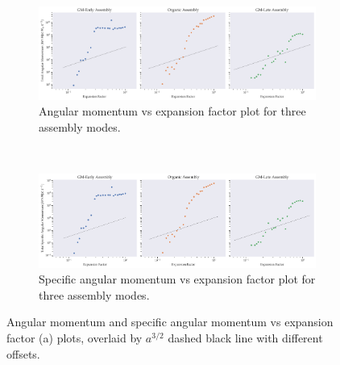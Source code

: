 \documentclass{article}
\begin{document}
	\begin{figure}
		\centering
		\begin{subfigure} {\columnwidth}
				\centering 
				\includegraphics[width=\columnwidth]{../../plots/angular_momentum/expansion_factor-net_angular_momentum.png}
				\caption{Angular momentum vs expansion factor plot for three assembly modes.}
		\end{subfigure} \\
			\vspace{1cm}
		\begin{subfigure} {\columnwidth}
				\centering 
				\includegraphics[width=\columnwidth]{../../plots/angular_momentum/expansion_factor-net_specific_angular_momentum.png}
				\caption{Specific angular momentum vs expansion factor plot for three assembly modes.}
		\end{subfigure}
		
		\caption{Angular momentum and specific angular momentum vs expansion factor (a) plots, overlaid by \(a^{3/2}\) dashed black line with different offsets.}
	\end{figure}

	\clearpage
\end{document}
